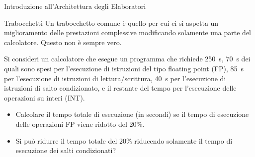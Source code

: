\documentclass[11pt]{article}
\begin{document}
\begin{quiz}{Introduzione all'Architettura degli Elaboratori}
\begin{cloze}[points=1,shuffle=true]{Trabocchetti}
Un trabocchetto comune è quello per cui ci si aspetta un miglioramento delle prestazioni complessive modificando solamente una parte del calcolatore. Questo non è sempre vero.

Si consideri un calcolatore che esegue un programma che richiede 250~s, 70~s dei quali sono spesi per l'esecuzione di istruzioni del tipo floating point (FP), 85~s per l'esecuzione di istruzioni di lettura/scrittura, 40~s per l'esecuzione di istruzioni di salto condizionato, e il restante del tempo per l'esecuzione delle operazioni su interi (INT).
\begin{itemize}
    \item Calcolare il tempo totale di esecuzione (in secondi) se il tempo di esecuzione delle operazioni FP viene ridotto del 20\%. 
    \item Si può ridurre il tempo totale del 20\% riducendo solamente il tempo di esecuzione dei salti condizionati?
\end{itemize}
\end{cloze}

\end{quiz}
\end{document}
